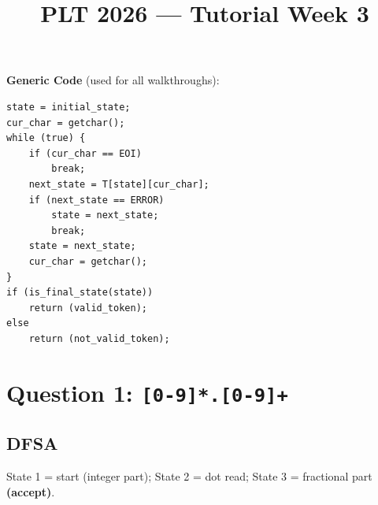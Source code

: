 \documentclass[a4paper,12pt]{article}
\title{PLT 2026 --- Tutorial Week 3}
\author{}
\date{}
\begin{document}
\maketitle

\noindent\textbf{Generic Code} (used for all walkthroughs):

\begin{lstlisting}
state = initial_state;
cur_char = getchar();
while (true) {
    if (cur_char == EOI)
        break;
    next_state = T[state][cur_char];
    if (next_state == ERROR)
        state = next_state;
        break;
    state = next_state;
    cur_char = getchar();
}
if (is_final_state(state))
    return (valid_token);
else
    return (not_valid_token);
\end{lstlisting}

\section{Question 1: \texttt{[0-9]*.[0-9]+}}

\subsection{DFSA}

\begin{center}
\end{center}

State 1 = start (integer part);\;
State 2 = dot read;\;
State 3 = fractional part \textbf{(accept)}.
\end{document}
